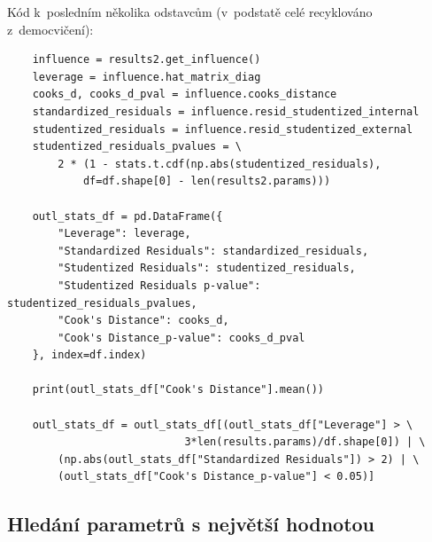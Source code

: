 \documentclass[a4paper, 11pt]{article}
\begin{document}
Kód k~posledním několika odstavcům (v~podstatě celé recyklováno z~democvičení):
\begin{verbatim}
    influence = results2.get_influence()
    leverage = influence.hat_matrix_diag
    cooks_d, cooks_d_pval = influence.cooks_distance
    standardized_residuals = influence.resid_studentized_internal
    studentized_residuals = influence.resid_studentized_external
    studentized_residuals_pvalues = \
        2 * (1 - stats.t.cdf(np.abs(studentized_residuals),
            df=df.shape[0] - len(results2.params)))

    outl_stats_df = pd.DataFrame({
        "Leverage": leverage,
        "Standardized Residuals": standardized_residuals,
        "Studentized Residuals": studentized_residuals,
        "Studentized Residuals p-value": studentized_residuals_pvalues,
        "Cook's Distance": cooks_d,
        "Cook's Distance_p-value": cooks_d_pval
    }, index=df.index)

    print(outl_stats_df["Cook's Distance"].mean())

    outl_stats_df = outl_stats_df[(outl_stats_df["Leverage"] > \
                            3*len(results.params)/df.shape[0]) | \
        (np.abs(outl_stats_df["Standardized Residuals"]) > 2) | \
        (outl_stats_df["Cook's Distance_p-value"] < 0.05)]
\end{verbatim}

\subsection{Hledání parametrů s největší hodnotou}
\end{document}

